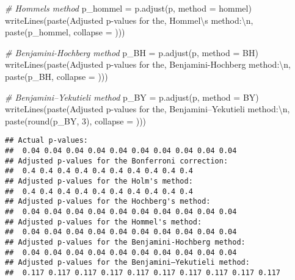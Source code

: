 \documentclass[
]{book}
\newenvironment{Shaded}{\begin{snugshade}}{\end{snugshade}}
\newcommand{\AttributeTok}[1]{\textcolor[rgb]{0.77,0.63,0.00}{#1}}
\newcommand{\CommentTok}[1]{\textcolor[rgb]{0.56,0.35,0.01}{\textit{#1}}}
\newcommand{\DecValTok}[1]{\textcolor[rgb]{0.00,0.00,0.81}{#1}}
\newcommand{\FunctionTok}[1]{\textcolor[rgb]{0.00,0.00,0.00}{#1}}
\newcommand{\NormalTok}[1]{#1}
\newcommand{\OtherTok}[1]{\textcolor[rgb]{0.56,0.35,0.01}{#1}}
\newcommand{\SpecialCharTok}[1]{\textcolor[rgb]{0.00,0.00,0.00}{#1}}
\newcommand{\StringTok}[1]{\textcolor[rgb]{0.31,0.60,0.02}{#1}}
\begin{document}
\begin{Shaded}
\begin{Highlighting}[]
\CommentTok{\# Hommel\textquotesingle{}s method}
\NormalTok{p\_hommel }\OtherTok{=} \FunctionTok{p.adjust}\NormalTok{(p, }\AttributeTok{method =} \StringTok{\textquotesingle{}hommel\textquotesingle{}}\NormalTok{)}
\FunctionTok{writeLines}\NormalTok{(}\FunctionTok{paste}\NormalTok{(}\StringTok{\textquotesingle{}Adjusted p{-}values for the\textquotesingle{}}\NormalTok{,}
                 \StringTok{\textquotesingle{}Hommel}\SpecialCharTok{\textbackslash{}\textquotesingle{}}\StringTok{s method:}\SpecialCharTok{\textbackslash{}n}\StringTok{\textquotesingle{}}\NormalTok{,}
                 \FunctionTok{paste}\NormalTok{(p\_hommel, }\AttributeTok{collapse =} \StringTok{\textquotesingle{} \textquotesingle{}}\NormalTok{)))}

\CommentTok{\# Benjamini{-}Hochberg method}
\NormalTok{p\_BH }\OtherTok{=} \FunctionTok{p.adjust}\NormalTok{(p, }\AttributeTok{method =} \StringTok{\textquotesingle{}BH\textquotesingle{}}\NormalTok{)}
\FunctionTok{writeLines}\NormalTok{(}\FunctionTok{paste}\NormalTok{(}\StringTok{\textquotesingle{}Adjusted p{-}values for the\textquotesingle{}}\NormalTok{,}
                 \StringTok{\textquotesingle{}Benjamini{-}Hochberg method:}\SpecialCharTok{\textbackslash{}n}\StringTok{\textquotesingle{}}\NormalTok{,}
                 \FunctionTok{paste}\NormalTok{(p\_BH, }\AttributeTok{collapse =} \StringTok{\textquotesingle{} \textquotesingle{}}\NormalTok{)))}

\CommentTok{\# Benjamini–Yekutieli method}
\NormalTok{p\_BY }\OtherTok{=} \FunctionTok{p.adjust}\NormalTok{(p, }\AttributeTok{method =} \StringTok{\textquotesingle{}BY\textquotesingle{}}\NormalTok{)}
\FunctionTok{writeLines}\NormalTok{(}\FunctionTok{paste}\NormalTok{(}\StringTok{\textquotesingle{}Adjusted p{-}values for the\textquotesingle{}}\NormalTok{,}
                 \StringTok{\textquotesingle{}Benjamini–Yekutieli method:}\SpecialCharTok{\textbackslash{}n}\StringTok{\textquotesingle{}}\NormalTok{,}
                 \FunctionTok{paste}\NormalTok{(}\FunctionTok{round}\NormalTok{(p\_BY, }\DecValTok{3}\NormalTok{), }\AttributeTok{collapse =} \StringTok{\textquotesingle{} \textquotesingle{}}\NormalTok{)))}
\end{Highlighting}
\end{Shaded}

\begin{verbatim}
## Actual p-values:
##  0.04 0.04 0.04 0.04 0.04 0.04 0.04 0.04 0.04 0.04
## Adjusted p-values for the Bonferroni correction:
##  0.4 0.4 0.4 0.4 0.4 0.4 0.4 0.4 0.4 0.4
## Adjusted p-values for the Holm's method:
##  0.4 0.4 0.4 0.4 0.4 0.4 0.4 0.4 0.4 0.4
## Adjusted p-values for the Hochberg's method:
##  0.04 0.04 0.04 0.04 0.04 0.04 0.04 0.04 0.04 0.04
## Adjusted p-values for the Hommel's method:
##  0.04 0.04 0.04 0.04 0.04 0.04 0.04 0.04 0.04 0.04
## Adjusted p-values for the Benjamini-Hochberg method:
##  0.04 0.04 0.04 0.04 0.04 0.04 0.04 0.04 0.04 0.04
## Adjusted p-values for the Benjamini–Yekutieli method:
##  0.117 0.117 0.117 0.117 0.117 0.117 0.117 0.117 0.117 0.117
\end{verbatim}
\end{document}

